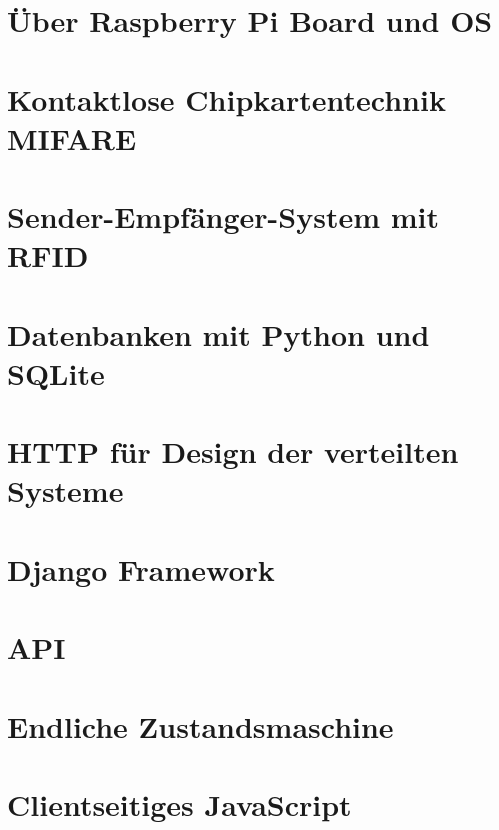 \section{Über Raspberry Pi Board und OS}
\label{sec:theorie:raspberry}

\section{Kontaktlose Chipkartentechnik MIFARE}
\label{sec:theorie:mifare}

\section{Sender-Empfänger-System mit RFID}
\label{sec:theorie:rfid}

\section{Datenbanken mit Python und SQLite}
\label{sec:theorie:db}

\section{HTTP für Design der verteilten Systeme}
\label{sec:theorie:http}

\section{Django Framework}
\label{sec:theorie:about_django}

\section{API}
\label{sec:theorie:api}

\section{Endliche Zustandsmaschine}
\label{sec:theorie:fsm}

\section{Clientseitiges JavaScript}
\label{sec:theorie:js}




